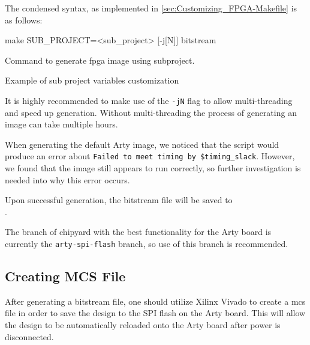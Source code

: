 The condensed syntax, as implemented in \cref{sec:Customizing_FPGA-Makefile} is as follows:

\begin{listing}[h!tbp]
  \begin{bashsource}
    make SUB_PROJECT=<sub_project> [-j[N]] bitstream
  \end{bashsource}
  \caption{Command to generate \Gls{fpga} image using subproject.}
  \label{lst:condensed_fpga_cmd}
\end{listing}

\begin{listing}[h!tbp]
	\caption{Example of sub project variables customization}
	\label{lst:$makefile_subproject_example}
\end{listing}

It is highly recommended to make use of the \texttt{-jN} flag to allow multi-threading and speed up generation.
Without multi-threading the process of generating an image can take multiple hours.

When generating the default Arty image, we noticed that the script would produce an error about \texttt{Failed to meet timing by \$timing\_slack}.
However, we found that the image still appears to run correctly, so further investigation is needed into why this error occurs.

Upon successful generation, the bitstream file will be saved to \\ .

The branch of chipyard with the best functionality for the Arty board is currently the \texttt{arty-spi-flash} branch, so use of this branch is recommended.

\subsection{Creating MCS File}\label{sec:Creating_MCS_file}
After generating a bitstream file, one should utilize Xilinx Vivado to create a \gls{mcs} file in order to save the design to the SPI flash on the Arty board.
This will allow the design to be automatically reloaded onto the Arty board after power is disconnected.

